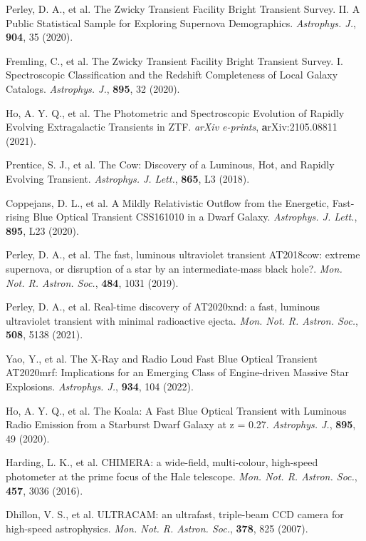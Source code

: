 \documentclass{nature_plusfigure}
\newcommand{\mn}{{Mon. Not. R. Astron. Soc.}}
\newcommand{\mnras}{\mn}
\newcommand{\apj}{{Astrophys. J.}}
\newcommand{\apjl}{{Astrophys. J. Lett.}}
\begin{document}
\begin{methods}
\begin{thebibliography}{10}
 Perley, D. A., et al. The Zwicky Transient Facility Bright Transient Survey. II. A Public Statistical Sample for Exploring Supernova Demographics. \emph{\apj}, \textbf{904}, 35 (2020). 

 Fremling, C., et al. The Zwicky Transient Facility Bright Transient Survey. I. Spectroscopic Classification and the Redshift Completeness of Local Galaxy Catalogs. \emph{\apj}, \textbf{895}, 32 (2020).

 Ho, A. Y. Q., et al. The Photometric and Spectroscopic Evolution of Rapidly Evolving Extragalactic Transients in ZTF. \emph{arXiv e-prints}, \textbf arXiv:2105.08811 (2021). 

 Prentice, S. J., et al. The Cow: Discovery of a Luminous, Hot, and Rapidly Evolving Transient. \emph{\apjl}, \textbf{865}, L3 (2018). 

 Coppejans, D. L., et al. A Mildly Relativistic Outflow from the Energetic, Fast-rising Blue Optical Transient CSS161010 in a Dwarf Galaxy. \emph{\apjl}, \textbf{895}, L23 (2020). 

 Perley, D. A., et al. The fast, luminous ultraviolet transient AT2018cow: extreme supernova, or disruption of a star by an intermediate-mass black hole?. \emph{\mnras}, \textbf{484}, 1031 (2019). 

 Perley, D. A., et al. Real-time discovery of AT2020xnd: a fast, luminous ultraviolet transient with minimal radioactive ejecta. \emph{\mnras}, \textbf{508}, 5138 (2021). 

 Yao, Y., et al. The X-Ray and Radio Loud Fast Blue Optical Transient AT2020mrf: Implications for an Emerging Class of Engine-driven Massive Star Explosions. \emph{\apj}, \textbf{934}, 104 (2022). 

 Ho, A. Y. Q., et al. The Koala: A Fast Blue Optical Transient with Luminous Radio Emission from a Starburst Dwarf Galaxy at z = 0.27. \emph{\apj}, \textbf{895}, 49 (2020). 

 Harding, L. K., et al. CHIMERA: a wide-field, multi-colour, high-speed photometer at the prime focus of the Hale telescope. \emph{\mnras}, \textbf{457}, 3036 (2016). 

 Dhillon, V. S., et al. ULTRACAM: an ultrafast, triple-beam CCD camera for high-speed astrophysics. \emph{\mnras}, \textbf{378}, 825 (2007). 


\end{thebibliography}
\end{methods}
\end{document}
